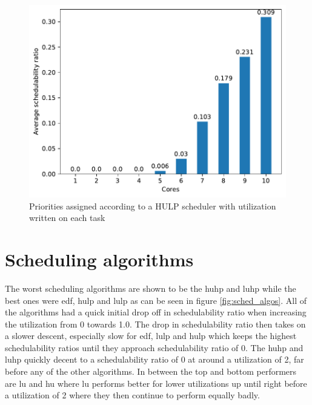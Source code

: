 \documentclass{kththesis}
\begin{document}
\begin{figure}

    \centering

    \includegraphics[width=0.8\linewidth]{images/core_amounts_averages.pdf}

    \caption{Priorities assigned according to a HULP scheduler with utilization written on each task}

    \label{fig:core_amounts_averages}

\end{figure}

\section{Scheduling algorithms} \label{sec:results_scheduling_algorithms}


The worst scheduling algorithms are shown to be the \acrshort{huhp} and \acrshort{luhp} while the
best ones were \acrshort{edf}, \acrshort{hulp} and \acrshort{lulp} as can be seen in figure
\ref{fig:sched_algos}. All of the algorithms had a quick initial drop off in schedulability ratio
when increasing the utilization from 0 towards 1.0. The drop in schedulability ratio then takes on a
slower descent, especially slow for \acrshort{edf}, \acrshort{lulp} and \acrshort{hulp} which keeps
the highest schedulability ratios until they approach schedulability ratio of 0. The \acrshort{huhp}
and \acrshort{luhp} quickly decent to a schedulability ratio of 0 at around a utilization of 2, far
before any of the other algorithms. In between the top and bottom performers are \acrshort{lu} and
\acrshort{hu} where \acrshort{lu} performs better for lower utilizations up until right
before a utilization of 2 where they then continue to perform equally badly.
\end{document}
